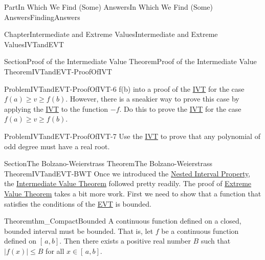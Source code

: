 \documentclass[oneside,10pt,]{book}
\numberwithin{equation}{part}
\begin{document}
\begin{partptx}{Part}{In Which We Find (Some) Answers}{}{In Which We Find (Some) Answers}{}{}{FindingAnswers}
\begin{chapterptx}{Chapter}{Intermediate and Extreme Values}{}{Intermediate and Extreme Values}{}{}{IVTandEVT}
\begin{sectionptx}{Section}{Proof of the Intermediate Value Theorem}{}{Proof of the Intermediate Value Theorem}{}{}{IVTandEVT-ProofOfIVT}
\begin{problem}{Problem}{}{IVTandEVT-ProofOfIVT-6}
f(b)\) into a proof of the \hyperref[IntermediateValueTheorem]{IVT} for the case \(f(a)\geq
v\geq f(b)\).  However, there is a sneakier way to prove this case by applying the \hyperref[IntermediateValueTheorem]{IVT} to the function \(-f\).  Do this to prove the \hyperref[IntermediateValueTheorem]{IVT} for the case \(f(a)\geq v\geq
f(b)\).%
\end{problem}
\begin{problem}{Problem}{}{IVTandEVT-ProofOfIVT-7}%
 Use the \hyperref[IntermediateValueTheorem]{IVT} to prove that any polynomial of odd degree must have a real root.%
\end{problem}
\end{sectionptx}
%
%
\typeout{************************************************}
\typeout{************************************************}
%
\begin{sectionptx}{Section}{The Bolzano-Weierstrass Theorem}{}{The Bolzano-Weierstrass Theorem}{}{}{IVTandEVT-BWT}
Once we introduced the \hyperref[NIP]{Nested Interval Property}, the \hyperref[IntermediateValueTheorem]{Intermediate Value Theorem}  followed pretty readily.  The proof of \hyperref[thm_EVT]{Extreme Value Theorem} takes a bit more work.  First we need to show that a function that satisfies the conditions of the \hyperref[thm_EVT]{EVT} is bounded.%
\begin{theorem}{Theorem}{}{}{thm_CompactBounded}%
%
A continuous function defined on a closed, bounded interval must be bounded.  That is, let \(f\) be a continuous function defined on \([\,a,b]\).  Then there exists a positive real number \(B\) such that \(|f(x)|\leq B\) for all \(x\in[\,a,b]\).%
\end{theorem}

\end{sectionptx}
\end{chapterptx}
\end{partptx}
\end{document}
